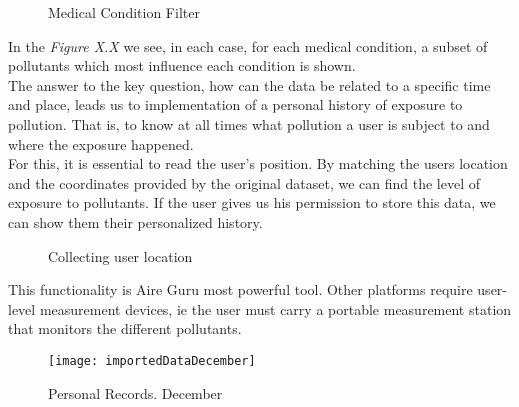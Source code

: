 \begin{figure}[ht]
  \centering
  \hfill
  \hfill
  \caption{Medical Condition Filter}
\end{figure}

In the \textit{Figure X.X} we see, in each case, for each medical condition, a subset of pollutants which most influence each condition is shown.\\
  
The answer to the key question, how can the data be related to a specific time and place, leads us to
implementation of a personal history of exposure to pollution. That is, to know at all times what pollution
a user is subject to and where the exposure happened.\\

For this, it is essential to read the user's position. By matching the users location and the coordinates provided by the original dataset, we can find the level of exposure to pollutants.
If the user gives us his permission to store this data, we can show them their personalized history.

\begin{figure}[ht]
  \centering 
    \caption{Collecting user location}
  \end{figure}

  This functionality is Aire Guru most powerful tool. Other platforms require user-level measurement devices, ie the user must carry
  a portable measurement station that monitors the different pollutants. \\

  \newpage
  \begin{figure}[ht]
      \centering
      \texttt{[image: importedDataDecember]}
      \caption{Personal Records. December}
  \end{figure}

